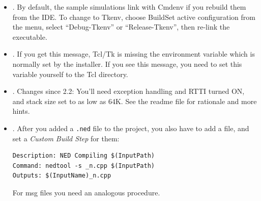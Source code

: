 \begin{itemize}
 \item {}. By default,
   the sample simulations link with Cmdenv if you rebuild them
   from the IDE. To change to Tkenv, choose Build{\textbar}Set
   active configuration from the menu, select ``Debug-Tkenv''
   or ``Release-Tkenv'', then re-link the executable.

 \item {}. If you get this message,
   Tcl/Tk is missing the  environment variable
   which is normally set by the installer. If you see this message,
   you need to set this variable yourself to the Tcl  directory.

 \item {}. Changes since {\opp} 2.2:
   You'll need exception handling and RTTI turned ON, and
   stack size set to as low as 64K.
   See the readme file for rationale and more hints.

 \item {}. After you added a \texttt{.ned} file
   to the project, you also have to add a  file, and set a
   \textit{Custom Build Step} for them:

\begin{verbatim}
Description: NED Compiling $(InputPath)
Command: nedtool -s _n.cpp $(InputPath)
Outputs: $(InputName)_n.cpp
\end{verbatim}

   For msg files you need an analogous procedure.

\end{itemize}



